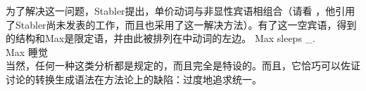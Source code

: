 
\eal
{}
\zl
为了解决这一问题，Stabler提出，单价动词与非显性宾语相组合（请看 \citet[, 124]{Veenstra98a}，他引用了Stabler尚未发表的工作，而且也采用了这一解决方法）。有了这一空宾语，得到的结构和Max是限定语，并由此被排列在中动词的左边。
\ea
\label{Beispiel-leeres-Element-intransitive-Verben}
\gll Max sleeps \_.\\
Max 睡觉 \\
\z
当然，任何一种这类分析都是规定的，而且完全是特设的。而且，它恰巧可以佐证 \citet[\S~2.1.2]{CJ2005a}讨论的转换生成语法在方法论上的缺陷：过度地追求统一。

